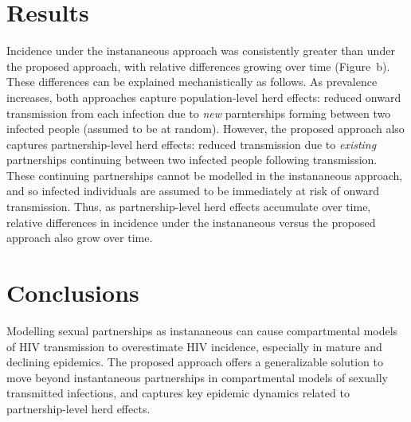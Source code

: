 \section{Results}
Incidence under the instananeous approach was
consistently greater than under the proposed approach,
with relative differences growing over time (Figure~b).
These differences can be explained mechanistically as follows.
As prevalence increases, both approaches capture population-level herd effects:
reduced onward transmission from each infection due to
\emph{new} parnterships forming between two infected people (assumed to be at random).
However, the proposed approach also captures partnership-level herd effects:
reduced transmission due to \emph{existing} partnerships
continuing between two infected people following transmission.
These continuing partnerships cannot be modelled in the instananeous approach,
and so infected individuals are assumed to be immediately at risk of onward transmission.
Thus, as partnership-level herd effects accumulate over time,
relative differences in incidence under the instananeous versus the proposed approach
also grow over time.
\section{Conclusions}
Modelling sexual partnerships as instananeous can cause
compartmental models of HIV transmission to overestimate HIV incidence,
especially in mature and declining epidemics.
The proposed approach offers a generalizable solution to move beyond instantaneous partnerships
in compartmental models of sexually transmitted infections,
and captures key epidemic dynamics related to partnership-level herd effects.
